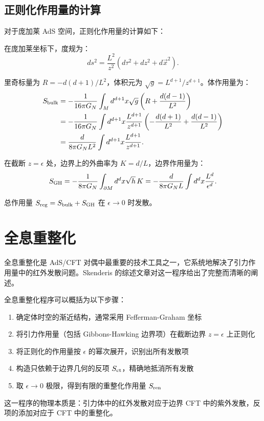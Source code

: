 \subsection{正则化作用量的计算}

对于庞加莱 AdS 空间，正则化作用量的计算如下：

\begin{example}[正则化作用量的计算]
在庞加莱坐标下，度规为：
\begin{equation}
    ds^2 = \frac{L^2}{z^2} \left( d\tau^2 + dz^2 + d\vec{x}^2 \right).
\end{equation}

里奇标量为 $R = -d(d+1)/L^2$，体积元为 $\sqrt{g} = L^{d+1}/z^{d+1}$。体作用量为：
\begin{align}
    S_{\rm bulk} &= -\frac{1}{16\pi G_N} \int_M d^{d+1}x \sqrt{g} \left( R + \frac{d(d-1)}{L^2} \right) \notag \\
    &= -\frac{1}{16\pi G_N} \int d^{d+1}x \frac{L^{d+1}}{z^{d+1}} \left( -\frac{d(d+1)}{L^2} + \frac{d(d-1)}{L^2} \right) \notag \\
    &= \frac{d}{8\pi G_N L^2} \int d^{d+1}x \frac{L^{d+1}}{z^{d+1}}.
\end{align}

在截断 $z = \epsilon$ 处，边界上的外曲率为 $K = d/L$，边界作用量为：
\begin{equation}
    S_{\rm GH} = -\frac{1}{8\pi G_N} \int_{\partial M} d^d x \sqrt{h} \, K = -\frac{d}{8\pi G_N L} \int d^d x \frac{L^d}{\epsilon^d}.
\end{equation}

总作用量 $S_{\rm reg} = S_{\rm bulk} + S_{\rm GH}$ 在 $\epsilon \to 0$ 时发散。
\end{example}

\section{全息重整化}

全息重整化是 AdS/CFT 对偶中最重要的技术工具之一，它系统地解决了引力作用量中的红外发散问题。Skenderis\cite{Skenderis2002} 的综述文章对这一程序给出了完整而清晰的阐述。

\begin{remark}[全息重整化的基本步骤]
全息重整化程序可以概括为以下步骤\cite{Skenderis2002}：
\begin{enumerate}
    \item 确定体时空的渐近结构，通常采用 Fefferman-Graham 坐标
    \item 将引力作用量（包括 Gibbons-Hawking 边界项）在截断边界 $z = \epsilon$ 上正则化
    \item 将正则化的作用量按 $\epsilon$ 的幂次展开，识别出所有发散项
    \item 构造只依赖于边界几何的反项 $S_{\rm ct}$，精确地抵消所有发散
    \item 取 $\epsilon \to 0$ 极限，得到有限的重整化作用量 $S_{\rm ren}$
\end{enumerate}
这一程序的物理本质是：引力体中的红外发散对应于边界 CFT 中的紫外发散，反项的添加对应于 CFT 中的重整化\cite{Henningson1998}。
\end{remark}

